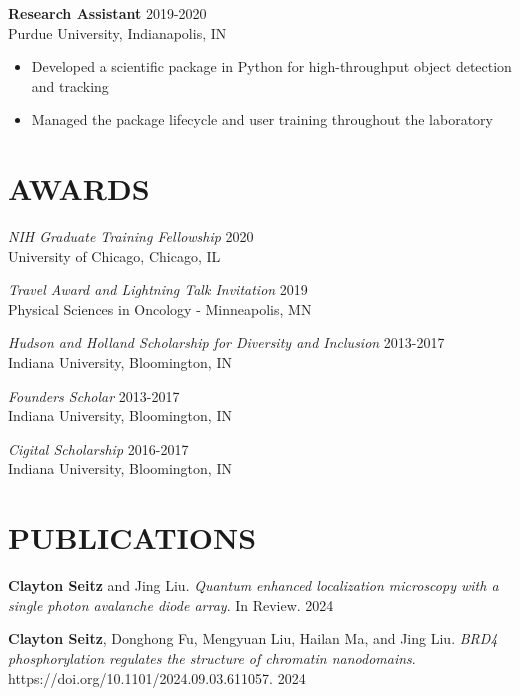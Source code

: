 \documentclass[margin, 10pt]{res} %
\begin{document}
\begin{resume}
\begin{itemize}
\end{itemize}
 
\textbf{Research Assistant} \hfill 2019-2020\\
Purdue University, Indianapolis, IN
\begin{itemize} \itemsep -2pt

\item Developed a scientific package in Python for high-throughput object detection and tracking
\item Managed the package lifecycle and user training throughout the laboratory

\end{itemize}



\section{AWARDS}

{\sl NIH Graduate Training Fellowship} \hfill 2020 \\
University of Chicago, Chicago, IL

{\sl Travel Award and Lightning Talk Invitation} \hfill 2019 \\
Physical Sciences in Oncology - Minneapolis, MN

{\sl Hudson and Holland Scholarship for Diversity and Inclusion} \hfill 2013-2017 \\
Indiana University, Bloomington, IN 

{\sl Founders Scholar} \hfill 2013-2017 \\
Indiana University, Bloomington, IN 

{\sl Cigital Scholarship} \hfill 2016-2017 \\
Indiana University, Bloomington, IN 

\section{PUBLICATIONS}

\textbf{Clayton Seitz} and Jing Liu. \textit{Quantum enhanced localization microscopy with a single photon avalanche diode array}. In Review. 2024

\textbf{Clayton Seitz}\textsuperscript{\textdagger}, Donghong Fu\textsuperscript{\textdagger}, Mengyuan Liu, Hailan Ma, and Jing Liu. \textit{BRD4 phosphorylation regulates the structure of chromatin nanodomains}.\\ https://doi.org/10.1101/2024.09.03.611057. 2024


\end{resume}
\end{document}
